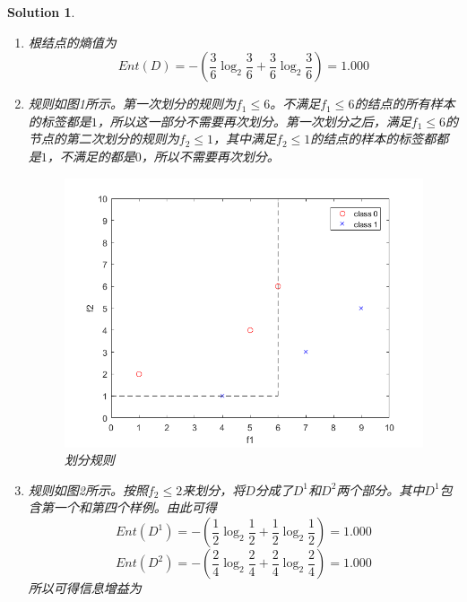 \documentclass[a4paper,UTF8]{article}
\numberwithin{equation}{section}
\newtheorem*{solution}{Solution}
\begin{document}
 \begin{solution}
 ~\\
 \begin{enumerate}
 \item [(1)]
 根结点的熵值为
 \begin{equation}
 Ent(D) = -(\frac{3}{6}\log_2\frac{3}{6} + \frac{3}{6}\log_2\frac{3}{6}) = 1.000
 \end{equation}
 \item [(2)]
 规则如图1所示。第一次划分的规则为$f_1\leq 6$。不满足$f_1\leq 6$的结点的所有样本的标签都是$1$，所以这一部分不需要再次划分。第一次划分之后，满足$f_1\leq 6$的节点的第二次划分的规则为$f_2\leq 1$，其中满足$f_2\leq 1$的结点的样本的标签都都是$1$，不满足的都是$0$，所以不需要再次划分。
 \begin{figure}[!h]
 	\centering   
 	\includegraphics[scale=0.5]{coordinate1.png}  
 	\caption{划分规则} 
 	\label{coordinate1}
 \end{figure}
 \item [(3)]
 规则如图2所示。按照$f_2\leq 2$来划分，将$D$分成了$D^1$和$D^2$两个部分。其中$D^1$包含第一个和第四个样例。由此可得
 \begin{equation}
 Ent(D^1) =  -(\frac{1}{2}\log_2\frac{1}{2} + \frac{1}{2}\log_2\frac{1}{2}) = 1.000
 \end{equation}
 \begin{equation}
 Ent(D^2) = -(\frac{2}{4}\log_2\frac{2}{4} + \frac{2}{4}\log_2\frac{2}{4}) = 1.000
 \end{equation}
 所以可得信息增益为
 \begin{equation}
 \begin{aligned}

\end{aligned}
\end{equation}
\end{enumerate}
\end{solution}
\end{document}
